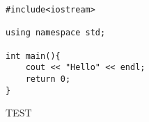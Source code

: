 \documentclass[11pt]{article}
\begin{document}
    \begin{verbatim}
#include<iostream>

using namespace std;

int main(){
    cout << "Hello" << endl;
    return 0;
}
    \end{verbatim}
    TEST\cite{TEST}
    
    
\end{document}
